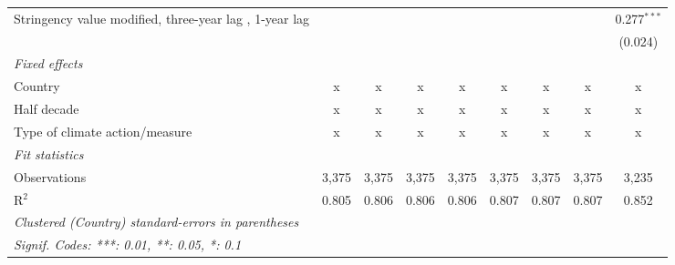 \begin{table}[htbp]
\begin{tabular}{lcccccccc}
      Stringency value modified, three-year lag , 1-year lag                      &              &                &                &                &                &                &                & 0.277$^{***}$\\   
                                                                                  &              &                &                &                &                &                &                & (0.024)\\   
      \emph{Fixed effects}\\
      Country                                                                     & x            & x              & x              & x              & x              & x              & x              & x\\  
      Half decade                                                                 & x            & x              & x              & x              & x              & x              & x              & x\\  
      Type of climate action/measure                                              & x            & x              & x              & x              & x              & x              & x              & x\\  
      \midrule \emph{Fit statistics}\\
      Observations                                                                & 3,375        & 3,375          & 3,375          & 3,375          & 3,375          & 3,375          & 3,375          & 3,235\\  
      R$^2$                                                                       & 0.805        & 0.806          & 0.806          & 0.806          & 0.807          & 0.807          & 0.807          & 0.852\\  
      \midrule
      \multicolumn{9}{l}{\emph{Clustered (Country) standard-errors in parentheses}}\\
      \multicolumn{9}{l}{\emph{Signif. Codes: ***: 0.01, **: 0.05, *: 0.1}}\\
   \end{tabular}
\end{table}


